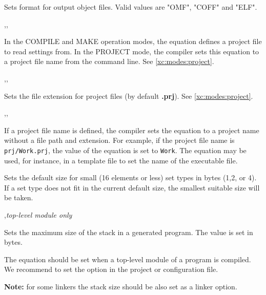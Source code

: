 \begin{description}
\ifgencode
{}
        \MLBegin{}\ModeC{}\MLEnd{}

        Sets format for output object files. Valid values are "OMF",
        "COFF" and "ELF".
\fi

        \MLBegin{}\ModeC{},\ModeM{},\ModeP{}\MLEnd{}

        In the COMPILE and MAKE operation modes, the equation
        defines a project file to read settings from.
        In the PROJECT mode, the compiler sets this equation to
        a project file name from the command line.
        See \ref{xc:modes:project}.

        \MLBegin{}\ModeC{},\ModeM{},\ModeP{}\MLEnd{}

        Sets the file extension for project files
        (by default {\bf .prj}). See \ref{xc:modes:project}.

        \MLBegin{}\ModeC{},\ModeM{},\ModeP{}\MLEnd{}

        If a project file name is defined, the compiler sets
        the equation to a project name without a file path and
        extension. For example, if the project file name is
        \verb'prj/Work.prj', the value of the equation is set
        to \verb'Work'. The equation may be used, for instance,
        in a template file to set the name of the executable file.

        \MLBegin{}\ModeC{}\MLEnd \inline

        Sets the default size for small (16 elements or less) set
        types in bytes (1,2, or 4).
        If a set type does not fit in the current default size,
        the smallest suitable size will be taken.

        \MLBegin{}\ModeC{},{\em top-level module only}\MLEnd{}

        Sets the maximum size of the stack in a generated program.
        The value is set in bytes.

        The equation should be set when a top-level module of a
        program is compiled. We recommend to set the option in the
        project or configuration file.

\ifgencode
        {\bf Note:} for some linkers the stack size
        should be also set as a linker option.
\fi


\end{description}
